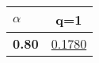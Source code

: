 \begin{tabular}{ | l || c |}
\hline
\textbf{$\alpha$} & \textbf{q=1} \\
\hline
\textbf{0.80} & \underline{0.1780}\\
\hline
\end{tabular}
